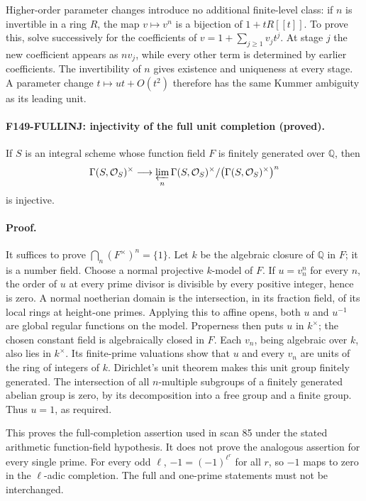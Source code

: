 Higher-order parameter changes introduce no additional finite-level
class: if \(n\) is invertible in a ring \(R\), the map
\(v\mapsto v^n\) is a bijection of \(1+tR[[t]]\).
To prove this, solve successively for the coefficients of
\(v=1+\sum_{j\geq1}v_jt^j\).  At stage \(j\) the new coefficient appears
as \(nv_j\), while every other term is determined by earlier
coefficients.  The invertibility of \(n\) gives existence and uniqueness
at every stage.  A parameter change \(t\mapsto ut+O(t^2)\) therefore has
the same Kummer ambiguity as its leading unit.

\paragraph{F149-FULLINJ: injectivity of the full unit completion (proved).}
If \(S\) is an integral scheme whose function field \(F\) is finitely
generated over \(\mathbb Q\), then
\[
 \Gamma(S,\mathcal O_S)^\times
 \longrightarrow
 \varprojlim_n\Gamma(S,\mathcal O_S)^\times/
       \bigl(\Gamma(S,\mathcal O_S)^\times\bigr)^n
\]
is injective.

\paragraph{Proof.}
It suffices to prove \(\bigcap_n(F^\times)^n=\{1\}\).  Let \(k\) be the
algebraic closure of \(\mathbb Q\) in \(F\); it is a number field.
Choose a normal projective \(k\)-model of \(F\).  If \(u=v_n^n\) for
every \(n\), the order of \(u\) at every prime divisor is divisible by
every positive integer, hence is zero.  A normal noetherian domain is
the intersection, in its fraction field, of its local rings at
height-one primes.  Applying this to affine opens, both \(u\) and
\(u^{-1}\) are global regular functions on the model.  Properness then
puts \(u\) in \(k^\times\); the chosen constant field is algebraically
closed in \(F\).  Each \(v_n\), being algebraic over \(k\), also lies in
\(k^\times\).  Its finite-prime valuations show that \(u\) and every
\(v_n\) are units of the ring of integers of \(k\).  Dirichlet's unit
theorem makes this unit group finitely generated.  The intersection
of all \(n\)-multiple subgroups of a finitely generated abelian group
is zero, by its decomposition into a free group and a finite group.
Thus \(u=1\), as required.

This proves the full-completion assertion used in scan 85 under the
stated arithmetic function-field hypothesis.  It does not prove the
analogous assertion for every single prime.  For every odd \(\ell\),
\(-1=(-1)^{\ell^r}\) for all \(r\), so \(-1\) maps to zero in the
\(\ell\)-adic completion.  The full and one-prime statements must not
be interchanged.

